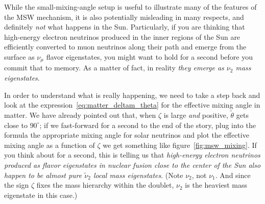 While the small-mixing-angle setup is useful to illustrate many of the features
of the MSW mechanism,  it is also potentially misleading in many respects, and
definitely \emph{not} what happens in the Sun. Particularly, if you are thinking
that high-energy electron neutrinos produced in the inner regions of the Sun are
efficiently converted to muon neutrinos along their path and emerge from the
surface as $\nu_\mu$ flavor eigenstates, you might want to hold for a second
before you commit that to memory.
As a matter of fact, in reality \emph{they emerge as $\nu_2$ mass eigenstates}.

\begin{marginfigure}
  
  \caption{Effective mixing angle in matter $\tilde{\theta}$ as a function of
    $\zeta$ for a mixing angle in vacuum $\theta_\odot = 33.41^\circ$ (current
    best-fit value for solar neutrino oscillations).}
  \label{fig:msw_mixing}
\end{marginfigure}

In order to understand what is really happening, we need to take a step back and
look at the expression~\eqref{eq:matter_deltam_theta} for the effective mixing
angle in matter. We have already pointed out that, when $\zeta$ is large \emph{and}
positive, $\tilde{\theta}$ gets close to $90^\circ$; if we fast-forward for a
second to the end of the story, plug into the formula the appropriate mixing angle
for solar neutrinos and plot the effective mixing angle as a function of $\zeta$
we get something like figure~\ref{fig:msw_mixing}. If you think about for a second,
this is telling us that \emph{high-energy electron neutrinos produced as flavor
eigenstates in nuclear fusion close to the center of the Sun also happen to be
almost pure $\tilde{\nu}_2$ local mass eigenstates}. (Note $\nu_2$, not $\nu_1$.
And since the sign $\zeta$ fixes the mass hierarchy within the doublet, $\nu_2$
is the heaviest mass eigenstate in this case.)

\begin{marginfigure}
  
  \caption{Effective mass squared $\tilde{m}^2_i$ in matter as a
    function of $\zeta$ for a mixing angle in vacuum $\theta_\odot = 33.41^\circ$
    and $\Delta m^2_\odot = 7.41 \times 10^{-5}$~eV$^2$ (current best-fit value
    for solar neutrino oscillations). Note the value of $\zeta$ corresponding to
    the resonance condition, indicated by the vertical dashed line, is $\sim 0.4$.}
  \label{fig:msw_mass}
\end{marginfigure}

